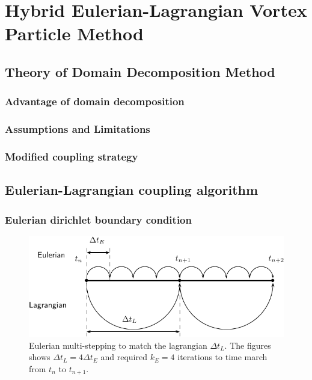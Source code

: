 \chapter{Hybrid Eulerian-Lagrangian Vortex Particle Method}
\label{ch:hybrid}

\section{Theory of Domain Decomposition Method}

\subsection{Advantage of domain decomposition}

\subsection{Assumptions and Limitations}

\subsection{Modified coupling strategy}

\section{Eulerian-Lagrangian coupling algorithm}

\subsection{Eulerian dirichlet boundary condition}

	
	\begin{figure}[t]
	\centering
	\includegraphics[width=0.7\linewidth]{./figures/eulerian/multiStep-crop.pdf}
	\caption{Eulerian multi-stepping to match the lagrangian $\Delta t_L$. The figures shows $\Delta t_L = 4 \Delta t_E$ and required $k_E = 4$ iterations to time march from $t_n$ to $t_{n+1}$.}
	\label{fig:multiStep}
	\end{figure}	


